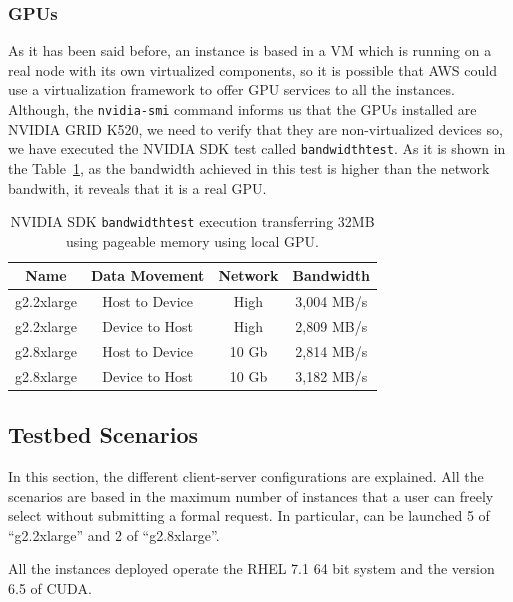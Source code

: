 \documentclass[a4paper,twoside]{article}
\begin{document}
\subsubsection{GPUs}
As it has been said before, an instance is based in a VM which is running on a real node with its own virtualized components, so it is possible that AWS could use a virtualization framework to offer GPU services to all the instances.
Although, the {\tt nvidia-smi} command informs us that the GPUs installed are NVIDIA GRID K520, we need to verify that they are non-virtualized devices so, we have executed the NVIDIA SDK test called {\tt bandwidthtest}. 
As it is shown in the Table~\ref{table:bwt}, as the bandwidth achieved in this test is higher than the network bandwith, it reveals that it is a real GPU. 
\begin{table}[htb]
\renewcommand{\arraystretch}{1.3}
\caption{NVIDIA SDK {\tt bandwidthtest} execution transferring 32MB using pageable memory using local GPU.}
\label{table:bwt}
\tabcolsep=0.09cm
\begin{center}\begin{tabular}{cccc}
Name &  Data Movement & Network & Bandwidth \\ \hline \hline
g2.2xlarge & Host to Device & High& 3,004 MB/s \\ \hline
g2.2xlarge & Device to Host & High& 2,809 MB/s\\ \hline
g2.8xlarge & Host to Device & 10 Gb& 2,814 MB/s\\ \hline
g2.8xlarge & Device to Host & 10 Gb& 3,182 MB/s\\ \hline
\end{tabular}\end{center}\end{table}

\subsection{Testbed Scenarios}
In this section, the different client-server configurations 
are explained. All the scenarios are based in the maximum number of instances 
that a user can freely select without submitting a formal request. 
In particular, can be launched 5 of ``g2.2xlarge'' and 2 of ``g2.8xlarge''.

All the instances deployed operate the RHEL 7.1 64 bit system and the version 6.5 of CUDA. 
\end{document}
